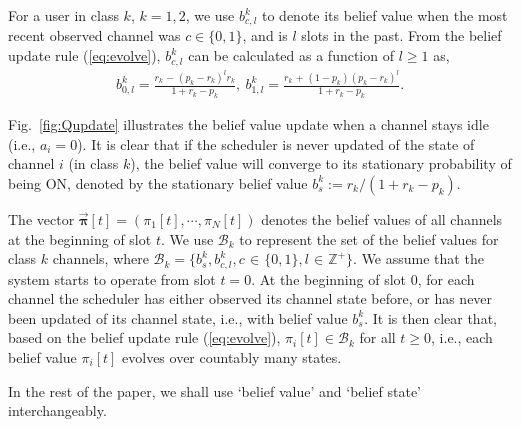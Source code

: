 \documentclass[11pt,twocolumn]{IEEEtran}
\begin{document}
For a user in class $k$, $k{=}1,2$, we use $b^k_{c,l}$ to denote its
belief value when the most recent observed channel was
$c\in \{0,1\}$, and is $l$ slots in the past. From the belief
update rule (\ref{eq:evolve}), $b^k_{c,l}$ can be calculated as a
function of $l {\geq} 1$ as,
\begin{align}
b^k_{0,l}{=}\frac{r_k\hspace{1pt}{-}\hspace{1pt}(p_k-r_k)^l
r_k}{1+r_k-p_k}, \
b^k_{1,l}{=}\frac{r_k\hspace{1pt}{+}\hspace{1pt}(1-p_k)(p_k-r_k)^l}{1+r_k-p_k}.
\nonumber
\end{align}

Fig.~\ref{fig:Qupdate} illustrates the belief value update when a channel stays idle
(i.e., $a_i{=}0$). It is clear
that if the scheduler is never updated of the state of channel $i$
(in class $k$), the belief value will converge to its stationary
probability of being ON, denoted by the stationary belief value
$b_s^{k}{:=}{r_k}/{(1{+}r_k{-}p_k)}$.

The vector $\vec{\bm \pi}[t]{=} ( \pi_1[t], {\cdots}, \pi_N[t])$ denotes the belief values of all channels at the beginning of slot $t$. We use $\mathcal{B}_k$ to represent the set of the belief values for class $k$ channels, where $\mathcal{B}_k{=}\{b^k_{s}, b^k_{c,l}, c \hspace{1pt}{\in}\hspace{1pt} \{0,1\}, l\hspace{1pt}{\in}\hspace{1pt} \mathbb{Z}^+ \}$. We assume that the system starts to operate from slot $t=0$. At the beginning of slot $0$, for each channel the scheduler has either observed its channel state before, or has never been updated of its channel state, i.e., with belief value $b^k_{s}$. It is then clear that, based on the belief update rule (\ref{eq:evolve}), $\pi_i[t] \in \mathcal{B}_k$ for all $t\geq0$, i.e., each belief value $\pi_i[t]$ evolves over countably many states.


In the rest of the paper, we shall use `belief value' and `belief state' interchangeably.
\end{document}

